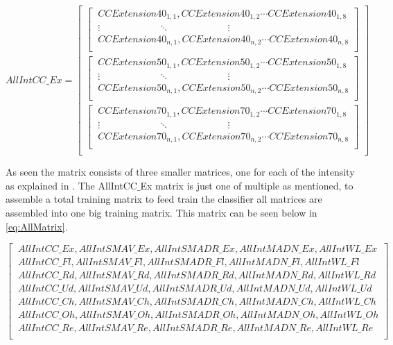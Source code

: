 \begin{equation} \label{eq:CCMatrix}
AllIntCC\_Ex=\begin{bmatrix} 
\begin{bmatrix}
\ CCExtension40_{1,1}, CCExtension40_{1,2} \cdots CCExtension40_{1,8} \\ 
\ \vdots \qquad \qquad \qquad \ddots \qquad \qquad \qquad \vdots \\
\ CCExtension40_{n,1}, CCExtension40_{n,2}  \cdots CCExtension40_{n,8} \\ \end{bmatrix} \\
\begin{bmatrix} 
\ CCExtension50_{1,1}, CCExtension50_{1,2} \cdots CCExtension50_{1,8} \\
\ \vdots \qquad \qquad \qquad \ddots \qquad \qquad \qquad \vdots \\
\ CCExtension50_{n,1}, CCExtension50_{n,2} \cdots CCExtension50_{n,8} \\ \end{bmatrix} \\
\begin{bmatrix} 
\ CCExtension70_{1,1}, CCExtension70_{1,2} \cdots CCExtension70_{1,8} \\
\ \vdots \qquad \qquad \qquad \ddots \qquad \qquad \qquad \vdots \\
\ CCExtension70_{n,1}, CCExtension70_{n,2} \cdots CCExtension70_{n,8} \\ \end{bmatrix} \\
\end{bmatrix}
\end{equation}

As seen the matrix consists of three smaller matrices, one for each of the intensity as explained in .  
The AllIntCC$\_$Ex matrix is just one of multiple as mentioned, to assemble a total training matrix to feed train the classifier all matrices are assembled into one big training matrix. This matrix can be seen below in \eqref{eq:AllMatrix}. 


\small \begin{equation} \label{eq:AllMatrix}
\begin{bmatrix} 
\ AllIntCC\_Ex, AllIntSMAV\_Ex, AllIntSMADR\_Ex, AllIntMADN\_Ex, AllIntWL\_Ex \\
\ AllIntCC\_Fl, AllIntSMAV\_Fl, AllIntSMADR\_Fl, AllIntMADN\_Fl, AllIntWL\_Fl \\
\ AllIntCC\_Rd, AllIntSMAV\_Rd, AllIntSMADR\_Rd, AllIntMADN\_Rd, AllIntWL\_Rd \\
\ AllIntCC\_Ud, AllIntSMAV\_Ud, AllIntSMADR\_Ud, AllIntMADN\_Ud, AllIntWL\_Ud \\
\ AllIntCC\_Ch, AllIntSMAV\_Ch, AllIntSMADR\_Ch, AllIntMADN\_Ch, AllIntWL\_Ch \\
\ AllIntCC\_Oh, AllIntSMAV\_Oh, AllIntSMADR\_Oh, AllIntMADN\_Oh, AllIntWL\_Oh \\
\ AllIntCC\_Re, AllIntSMAV\_Re, AllIntSMADR\_Re, AllIntMADN\_Re, AllIntWL\_Re \\
\end{bmatrix}
\end{equation}

